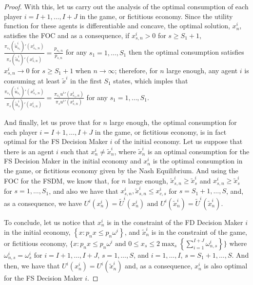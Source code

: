 \documentclass[pdftex]{article}
\numberwithin{equation}{section}
\theoremstyle{th}
\newtheorem{proof lemma}{{Proof Lemma}.}
\theoremstyle{definition}
\newtheorem*{risk lovers}{Risk lovers}
\newtheorem*{risk averse}{Risk averse}
\begin{document}
{\begin{proof}
With this, let us carry out the analysis of the optimal consumption of each player $i=I+1,\dots,I+J$ in the game, or fictitious economy. Since the utility function for these agents is differentiable and concave, the optimal solution, $x^i_n$, satisfies the FOC and as a consequence, if $x^i_{s,n}>0$ for $s\geq{S}_1+1$, $\frac{\pi_{s_1}{\left(\tilde{u}^i_{s_1}\right)}'\left(x^i_{s_{1},n}\right)}{\pi_s{\left(\tilde{u}^i_s\right)}'\left(x^i_{s,n}\right)}=\frac{p_{s_{1,}n}}{p_{s,n}}$ for any $s_1=1,\dots,S_1$ then the optimal consumption satisfies $x^i_{s,n}\rightarrow0$ for $s\geq{S}_1+1$ when $n\rightarrow\infty$; therefore, for $n$ large enough, any agent $i$ is consuming at least $\tilde{x}^i$ in the first $S_1$ states, which imples that $\frac{\pi_{s_1}{\left(\tilde{u}^i_{s_1}\right)}'\left(x^i_{s_{1},n}\right)}{\pi_s{\left(\tilde{u}^i_s\right)}'\left(x^i_{s,n}\right)}=\frac{\pi_{s_{1}}{u^i}'\left(x^i_{s_{1},n}\right)}{\pi_s{u^i}'\left(x^i_{s,n}\right)}$ for any $s_1=1,\dots,S_1$.

And finally, let us prove that for $n$ large enough, the optimal consumption for each player $i=I+1,\dots,I+J$ in the game, or fictitious economy, is in fact optimal for the FS Decision Maker $i$ of the initial economy. Let us suppose that  there is an agent $i$ such that $x_n^i\neq\tilde{x}_n^{i}$, where $\tilde{x}_n^{i}$ is an optimal consumption for the FS Decision Maker in the initial economy and $x_n^i$ is the optimal consumption in the game, or fictitious economy given by the Nash Equilibrium. And using the FOC for the FSDM, we know that, for $n$ large enough, $\tilde{x}^i_{s,n}\geq\tilde{x}^i_s$ and ${x}^i_{s,n}\geq\tilde{x}^i_s$ for $s=1,\dots,S_1$, and also we have that $x_{s,n}^i,\tilde{x}_{s,n}^{i}\leq{x}^i_{c,s}$ for $s=S_1+1,\dots,S$, and, as a consequence, we have $U^i\left(x^i_n\right)=\tilde{U}^i\left(x^i_n\right)\textrm{ and }U^i\left(\tilde{x}^i_n\right)=\tilde{U}^i\left(\tilde{x}^i_n\right)$.

To conclude, let us notice that $x^i_n$ is in the constraint of the FD Decision Maker $i$ in the initial economy, $\left\{x:p_nx\leq{p}_n\omega^i\right\}$, and $\tilde{x}^i_n$ is in the constraint of the game, or fictitious economy, $\Big\{x:p_nx\leq{p}_n\omega^i\textrm{ and }0\leq{x}_s\leq2\max_s\left\{\sum_{i=1}^{I+J}\omega_{n,s}^i\right\}\Big\}$ where $\omega_{n,s}^i=\omega_s^i$ for $i=I+1,\dots,I+J$, $s=1,\dots,S$, and $i=1,\dots,I$, $s=S_1+1,\dots,S$. And then, we have that
${U}^i\left(x^i_n\right)={U}^i\left(\tilde{x}^i_n\right)$
and, as a consequence, $x^i_n$ is also optimal for the FS Decision Maker $i$.
\end{proof}


}
\end{document}

